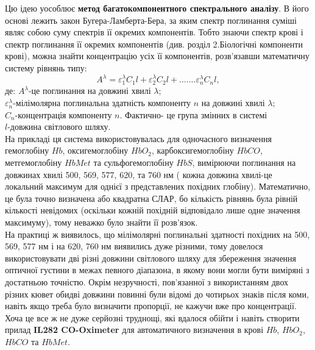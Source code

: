 \documentclass[14pt,a4paper]{scrartcl}
\begin{document}
Цю ідею уособлює {\bf метод багатокомпонентного спектрального аналізу}\cite{l6}. В його основі лежить закон Бугера-Ламберта-Бера, за яким спектр поглинання суміші являє собою суму спектрів її окремих компонентів. Тобто знаючи спектр крові і спектр поглинання її окремих компонентів (див. розділ 2.Біологічні компоненти крові), можна знайти концентрацію усіх її компонентів, розв'язавши математичну систему рівнянь типу:
\begin{equation}
A^{\lambda}=\varepsilon_1^{\lambda}C_1l+\varepsilon_2^{\lambda}C_2l+.......\varepsilon_n^{\lambda}C_nl,
\end{equation}
де: $A^{\lambda}$-це поглинання на довжині хвилі $\lambda$;\\
$\varepsilon_n^{\lambda}$-мілімолярна поглинальна здатність компоненту $n$ на довжині хвилі $\lambda$;\\
$C_n$-концентрація компоненту $n$. Фактично- це група змінних в системі\\
$l$-довжина світлового шляху.\\

\newpage
На прикладі ця система використовувалась для одночасного визначення гемоглобіну $Hb$, оксигемоглобіну $HbO_2$, карбоксигемоглобіну $HbCO$, метгемоглобіну $HbMet$ та сульфогемоглобіну $HbS$, вимірюючи поглинання на довжинах хвилі  500, 569, 577, 620, та 760 нм ( кожна довжина хвилі-це локальний максимум для однієї з представлених похідних глобіну). Математично, це була точно визначена або квадратна СЛАР, бо кількість рівнянь була рівній кількості невідомих (оскільки кожній похідній відповідало лише одне значення максимуму), тому неважко було знайти її розв'язок.\\

На практиці ж виявилось, що мілімолярні поглинальні здатності похідних на  500, 569, 577 нм і на 620, 760 нм виявились дуже різними, тому довелося використовувати дві різні довжини світлового шляху для збереження значення оптичної густини в межах певного діапазона, в якому вони могли бути виміряні з достатньою точністю. Окрім незручності, пов'язанної з використанням двох різних кювет обидві довжини повинні були відомі до чотирьох знаків після коми, навіть якщо треба було визначити пропорції, не кажучи вже про концентрації. Хоча це все ж не дуже серйозні труднощі, які вдалося обійти і навіть створити прилад {\bf IL282 CO-Oximeter} для автоматичного визначення в крові $Hb$, $HbO_2$, $HbCO$ та $HbMet$.\\
\end{document}
